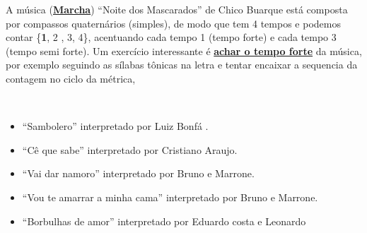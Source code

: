 \begin{example}
\label{ex:compassosimples4t}
A música (\hyperref[subsec:marcha]{\textbf{Marcha}}) ``Noite dos Mascarados'' de Chico Buarque 
está composta por compassos quaternários (simples), de modo que tem 4 tempos 
e podemos contar \{\textbf{1}, 2 , 3, 4\}, acentuando cada tempo 1 (tempo forte) e cada tempo 3 (tempo semi forte).
Um exercício interessante é \hyperref[subsec:perceberTF1]{\textbf{achar o tempo forte}} da música,
por exemplo seguindo as sílabas tônicas na letra 
e tentar encaixar a sequencia da contagem no ciclo da métrica, 
\end{example}

\begin{example}
~
\begin{itemize}
\item ``Sambolero'' interpretado por Luiz Bonfá \cite[pp. 49]{sambolero}.
\item ``Cê que sabe'' interpretado por Cristiano Araujo.
\item ``Vai dar namoro'' interpretado por Bruno e Marrone.
\item ``Vou te amarrar a minha cama'' interpretado por Bruno e Marrone.
\item ``Borbulhas de amor'' interpretado por Eduardo costa e Leonardo%
\end{itemize}
\end{example}

